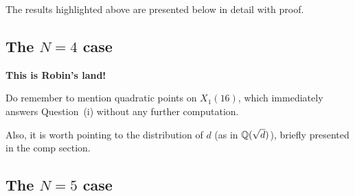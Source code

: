 The results highlighted above are presented below in detail with
proof.

\subsection{The $N = 4$ case}


\textbf{This is Robin's land!}

Do remember to mention quadratic points on $X_1(16)$, which
immediately answers Question~(i) without any further computation.

Also, it is worth pointing to the distribution of $d$ (as in
$\mathbb{Q}(\sqrt{d})$), briefly presented in the comp section.

\subsection{The $N = 5$ case}



